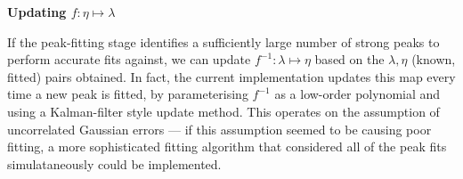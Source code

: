 \vspace{1em}

{\bf{Updating $f : \eta \mapsto \lambda$}}

\vspace{1em}

If the peak-fitting stage identifies a sufficiently large number of
strong peaks to perform accurate fits against, we can update $f^{-1} : \lambda \mapsto
\eta$ based on the $\lambda, \eta$ (known, fitted) pairs obtained.
In fact, the current implementation updates this map every time a new peak
is fitted, by parameterising $f^{-1}$ as a low-order polynomial and using
a Kalman-filter style update method. This operates on the assumption of
uncorrelated Gaussian errors --- if this assumption seemed to be causing
poor fitting, a more sophisticated fitting algorithm that considered all
of the peak fits simulataneously could be implemented.


